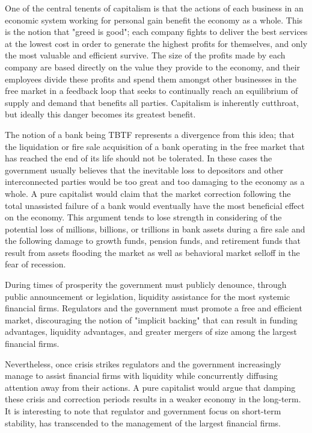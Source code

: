 One of the central tenents of capitalism is that the actions of each business in an economic system working for personal gain benefit the economy as a whole. This is the notion that "greed is good"; each company fights to deliver the best services at the lowest cost in order to generate the highest profits for themselves, and only the most valuable and efficient survive. The size of the profits made by each company are based directly on the value they provide to the economy, and their employees divide these profits and spend them amongst other businesses in the free market in a feedback loop that seeks to continually reach an equilibrium of supply and demand that benefits all parties. Capitalism is inherently cutthroat, but ideally this danger becomes its greatest benefit.

The notion of a bank being TBTF represents a divergence from this idea; that the liquidation or fire sale acquisition of a bank operating in the free market that has reached the end of its life should not be tolerated. In these cases the government usually believes that the inevitable loss to depositors and other interconnected parties would be too great and too damaging to the economy as a whole. A pure capitalist would claim that the market correction following the total unassisted failure of a bank would eventually have the most beneficial effect on the economy. This argument tends to lose strength in considering of the potential loss of millions, billions, or trillions in bank assets during a fire sale and the following damage to growth funds, pension funds, and retirement funds that result from assets flooding the market as well as behavioral market selloff in the fear of recession.

During times of prosperity the government must publicly denounce, through public announcement or legislation, liquidity assistance for the most systemic financial firms.  Regulators and the government must promote a free and efficient market, discouraging the notion of "implicit backing" that can result in funding advantages, liquidity advantages, and greater mergers of size among the largest financial firms. 

Nevertheless, once crisis strikes regulators and the government increasingly manage to assist financial firms with liquidity while concurrently diffusing attention away from their actions.  A pure capitalist would argue that damping these crisis and correction periods results in a weaker economy in the long-term. It is interesting to note that regulator and government focus on short-term stability, has transcended to the management of the largest financial firms.  

